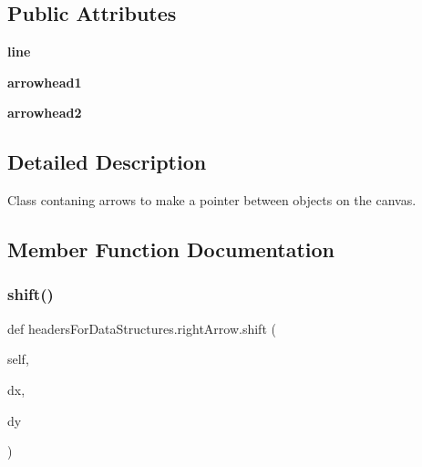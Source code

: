 \subsection*{Public Attributes}
\begin{DoxyCompactItemize}
\item 
\mbox{\label{classheaders_for_data_structures_1_1right_arrow_aee6de10c02c9ea41f85dda3608bc2c29}} 
{\bfseries line}
\item 
\mbox{\label{classheaders_for_data_structures_1_1right_arrow_a8d9040aee6f54367b956a1af7aec6401}} 
{\bfseries arrowhead1}
\item 
\mbox{\label{classheaders_for_data_structures_1_1right_arrow_a057c3637cb94f18827aa4ffa86dd3355}} 
{\bfseries arrowhead2}
\end{DoxyCompactItemize}


\subsection{Detailed Description}
Class contaning arrows to make a pointer between objects on the canvas. 

\subsection{Member Function Documentation}
\mbox{\label{classheaders_for_data_structures_1_1right_arrow_af8bc218c398594f3c400f9b7e0a30b8a}} 
\subsubsection{\texorpdfstring{shift()}{shift()}}
{\footnotesize\ttfamily def headers\+For\+Data\+Structures.\+right\+Arrow.\+shift (\begin{DoxyParamCaption}\item[{}]{self,  }\item[{}]{dx,  }\item[{}]{dy }\end{DoxyParamCaption})}



